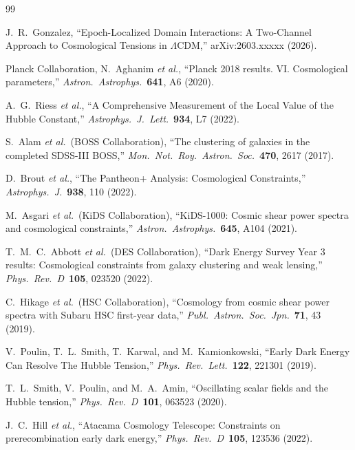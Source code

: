 \documentclass[aps,prd,twocolumn,superscriptaddress,nofootinbib]{revtex4-2}
\begin{document}
\begin{thebibliography}{99}

J.~R.~Gonzalez,
``Epoch-Localized Domain Interactions: A Two-Channel Approach to
Cosmological Tensions in $\Lambda$CDM,''
arXiv:2603.xxxxx (2026).

Planck Collaboration, N.~Aghanim \emph{et al.},
``Planck 2018 results. VI. Cosmological parameters,''
\emph{Astron.\ Astrophys.}\ \textbf{641}, A6 (2020).

A.~G.~Riess \emph{et al.},
``A Comprehensive Measurement of the Local Value of the Hubble Constant,''
\emph{Astrophys.\ J.\ Lett.}\ \textbf{934}, L7 (2022).

S.~Alam \emph{et al.}\ (BOSS Collaboration),
``The clustering of galaxies in the completed SDSS-III BOSS,''
\emph{Mon.\ Not.\ Roy.\ Astron.\ Soc.}\ \textbf{470}, 2617 (2017).

D.~Brout \emph{et al.},
``The Pantheon+ Analysis: Cosmological Constraints,''
\emph{Astrophys.\ J.}\ \textbf{938}, 110 (2022).

M.~Asgari \emph{et al.}\ (KiDS Collaboration),
``KiDS-1000: Cosmic shear power spectra and cosmological constraints,''
\emph{Astron.\ Astrophys.}\ \textbf{645}, A104 (2021).

T.~M.~C.~Abbott \emph{et al.}\ (DES Collaboration),
``Dark Energy Survey Year 3 results: Cosmological constraints from
galaxy clustering and weak lensing,''
\emph{Phys.\ Rev.\ D}\ \textbf{105}, 023520 (2022).

C.~Hikage \emph{et al.}\ (HSC Collaboration),
``Cosmology from cosmic shear power spectra with Subaru HSC first-year
data,''
\emph{Publ.\ Astron.\ Soc.\ Jpn.}\ \textbf{71}, 43 (2019).

V.~Poulin, T.~L.~Smith, T.~Karwal, and M.~Kamionkowski,
``Early Dark Energy Can Resolve The Hubble Tension,''
\emph{Phys.\ Rev.\ Lett.}\ \textbf{122}, 221301 (2019).

T.~L.~Smith, V.~Poulin, and M.~A.~Amin,
``Oscillating scalar fields and the Hubble tension,''
\emph{Phys.\ Rev.\ D}\ \textbf{101}, 063523 (2020).

J.~C.~Hill \emph{et al.},
``Atacama Cosmology Telescope: Constraints on prerecombination early
dark energy,''
\emph{Phys.\ Rev.\ D}\ \textbf{105}, 123536 (2022).


\end{thebibliography}
\end{document}
